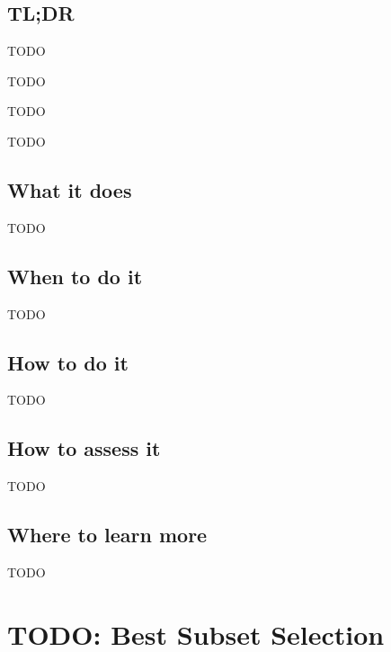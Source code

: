 \documentclass[
]{book}
\providecommand{\tightlist}{%
  \setlength{\itemsep}{0pt}\setlength{\parskip}{0pt}}
\begin{document}
\hypertarget{tldr-9}{%
\section{TL;DR}\label{tldr-9}}

\begin{description}
\tightlist
\item[What it does]
TODO
\item[When to do it]
TODO
\item[How to do it]
TODO
\item[How to assess it]
TODO
\end{description}

\hypertarget{what-it-does-9}{%
\section{What it does}\label{what-it-does-9}}

TODO

\hypertarget{when-to-do-it-9}{%
\section{When to do it}\label{when-to-do-it-9}}

TODO

\hypertarget{how-to-do-it-9}{%
\section{How to do it}\label{how-to-do-it-9}}

TODO

\hypertarget{how-to-assess-it-9}{%
\section{How to assess it}\label{how-to-assess-it-9}}

TODO

\hypertarget{where-to-learn-more-9}{%
\section{Where to learn more}\label{where-to-learn-more-9}}

TODO

\hypertarget{best-subset-selection}{%
\chapter{TODO: Best Subset Selection}\label{best-subset-selection}}
\end{document}
